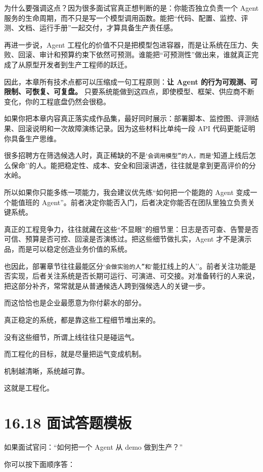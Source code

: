 为什么要强调这点？因为很多面试官真正想判断的是：你能否独立负责一个 Agent 服务的生命周期，而不只是写一个模型调用函数。能把``代码、配置、监控、评测、文档、运行手册''一起交付，才算具备生产责任感。


再进一步说，Agent 工程化的价值不只是把模型包进容器，而是让系统在压力、失败、回滚、审计和预算约束下依然可预测。谁能把``可预测性''做出来，谁就真正完成了从原型开发者到生产工程师的跃迁。


因此，本章所有技术点都可以压缩成一句工程原则：\textbf{让 Agent 的行为可观测、可限制、可恢复、可复盘。} 只要系统能做到这四点，即使模型、框架、供应商不断变化，你的工程底盘仍然会很稳。


如果你把本章内容真正落实成作品集，最好同时展示：部署脚本、监控图、评测结果、回滚说明和一次故障演练记录。因为这些材料比单纯一段 API 代码更能证明你具备生产思维。


很多招聘方在筛选候选人时，真正稀缺的不是`\texttt{会调用模型''的人，而是}`知道上线后怎么保命''的人。能把稳定性、成本、安全和回滚讲透，往往就是拿到更高评价的分水岭。


所以如果你只能多练一项能力，我会建议优先练``如何把一个能跑的 Agent 变成一个能值班的 Agent''。前者决定你能否入门，后者决定你能否在团队里独立负责关键系统。


真正的工程竞争力，往往就藏在这些``不显眼''的细节里：日志是否可查、告警是否可信、预算是否可控、回滚是否演练过。把这些细节做扎实，Agent 才不是演示品，而是可以稳定创造业务价值的系统。


也因此，部署章节往往最能区分`\texttt{会做实验的人''和}`能扛线上的人''。前者关注功能是否实现，后者关注系统是否长期可运行、可演进、可交接。对准备转行的人来说，把这部分补齐，常常就是从普通候选人跨到强候选人的关键一步。


而这恰恰也是企业最愿意为你付薪水的部分。


真正稳定的系统，都是靠这些工程细节堆出来的。


没有这些细节，所谓上线往往只是碰运气。


而工程化的目标，就是尽量把运气变成机制。


机制越清晰，系统越可靠。


这就是工程化。


\section{16.18 面试答题模板}

如果面试官问：``如何把一个 Agent 从 demo 做到生产？''


你可以按下面顺序答：



